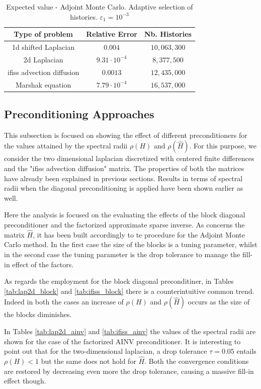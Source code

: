 \documentclass[a4paper,10pt]{article}
\begin{document}
\begin{table}[!h]
\centering
\begin{tabular}{|c|c|c|}
\hline
\textbf{Type of problem} & \textbf{Relative Error} &\textbf{Nb. Histories}\\
\hline
1d shifted Laplacian & $0.004$ & $10,063,300$\\
\hline
2d Laplacian & $ 9.31 \cdot 10^{-4} $ & $ 8,377,500 $\\
\hline
ifiss advection diffusion & $ 0.0013 $  & $ 12,435,000 $\\
\hline
Marshak equation & $7.79 \cdot 10^{-4}$ & $16,537,000$\\
\hline
\end{tabular}
\caption{Expected value - Adjoint Monte Carlo. Adaptive selection of histories.
$\varepsilon_1=10^{-3}$}
\label{tab:Adj_adapt6}
\end{table}

\subsection{Preconditioning Approaches}

This subsection is focused on showing the effect of different preconditioners
for the values attained by the spectral radii $\rho(H)$ and $\rho(\hat{H})$.
For this purpose, we consider the two dimensional laplacian
discretized with centered finite differences and the "ifiss advection
diffusion" matrix. The properties of both the matrices have already been
explained in previous sections.
Results in terms of spectral radii when the diagonal preconditioning is applied
have been shown earlier as well.

Here the analysis is focused on the evaluating the effects of the
block diagonal preconditioner and the factorized approximate sparse inverse.
As concerns the matrix $\hat{H}$, it has been built accordingly to te
procedure for the Adjoint Monte Carlo method. In
the first case the size of the blocks is a tuning parameter, whilst in the
second case the tuning parameter is the drop tolerance to manage the fill-in
effect of the factors.

As regards the employment for the block diagonal preconditiner, in Tables
\ref{tab:lap2d_block} and \ref{tab:ifiss_block} there is a counterintuitive
common trend. Indeed in both the cases an increase of $\rho(H)$ and
$\rho(\hat{H})$  occurs as the size of the blocks diminishes.

In Tables \ref{tab:lap2d_ainv} and \ref{tab:ifiss_ainv} the values of
the spectral radii are shown for the case of the factorized AINV
preconditioner. It is interesting to point out that for the
two-dimensional
laplacian, a drop tolerance $\tau=0.05$ entails $\rho(H)<1$ but the same does
not hold for $\hat{H}$. Both the convergence conditions are restored by
decreasing even more the drop tolerance, causing a massive fill-in effect
though.
\end{document}
